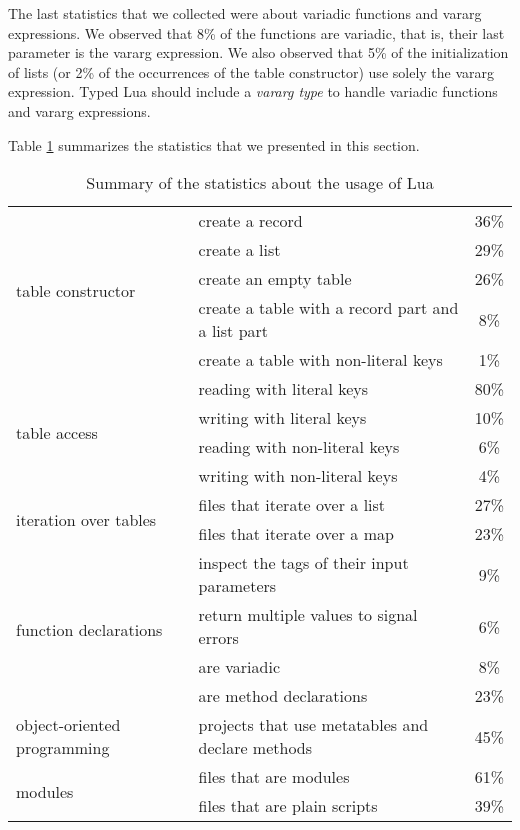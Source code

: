 The last statistics that we collected were about variadic functions
and vararg expressions.
We observed that 8\% of the functions are variadic, that is,
their last parameter is the vararg expression.
We also observed that 5\% of the initialization of lists
(or 2\% of the occurrences of the table constructor) use solely the
vararg expression.
Typed Lua should include a \emph{vararg type} to handle variadic
functions and vararg expressions.

Table \ref{tab:statistics} summarizes the statistics that we presented in this section.

\begin{table}[!ht]
\begin{center}
\begin{tabular}{|l|p{6cm}|c|}
\hline
\multirow{5}{*}{table constructor}
& create a record & 36\% \\
\cline{2-3}
& create a list & 29\% \\
\cline{2-3}
& create an empty table & 26\% \\
\cline{2-3}
& create a table with a record part and a list part & 8\% \\
\cline{2-3}
& create a table with non-literal keys & 1\% \\
\hline
\multirow{4}{*}{table access}
& reading with literal keys & 80\% \\
\cline{2-3}
& writing with literal keys & 10\% \\
\cline{2-3}
& reading with non-literal keys & 6\% \\
\cline{2-3}
& writing with non-literal keys & 4\% \\
\hline
\multirow{2}{*}{iteration over tables} &
files that iterate over a list & 27\% \\
\cline{2-3}
& files that iterate over a map & 23\% \\
\hline
\multirow{4}{*}{function declarations}
& inspect the tags of their input parameters & 9\% \\
\cline{2-3}
& return multiple values to signal errors & 6\% \\
\cline{2-3}
& are variadic & 8\% \\
\cline{2-3}
& are method declarations & 23\% \\
\hline
\multirow{1}{*}{object-oriented programming}
& projects that use metatables and declare methods & 45\% \\
\hline
\multirow{2}{*}{modules}
& files that are modules & 61\% \\
\cline{2-3}
& files that are plain scripts & 39\% \\
\hline
\end{tabular}
\end{center}
\caption{Summary of the statistics about the usage of Lua}
\label{tab:statistics}
\end{table}

